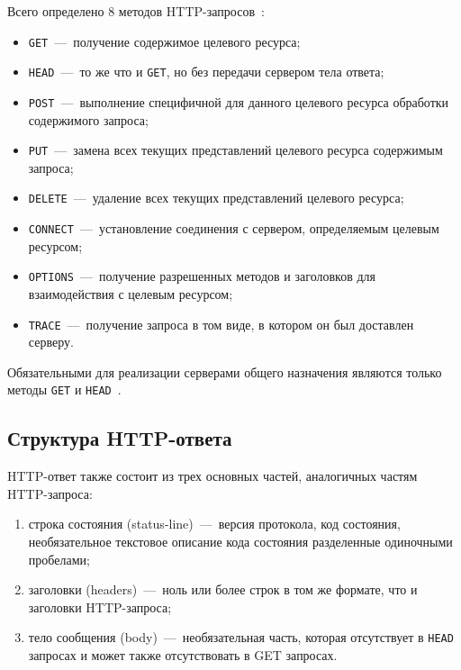 Всего определено 8 методов HTTP-запросов~\cite{rfc9110}:
\begin{itemize}
	\item \texttt{GET}~---~получение содержимое целевого ресурса;
	\item \texttt{HEAD}~---~то же что и \texttt{GET}, но без передачи сервером тела ответа;
	\item \texttt{POST}~---~выполнение специфичной для данного целевого ресурса обработки содержимого запроса;
	\item \texttt{PUT}~---~замена всех текущих представлений целевого ресурса содержимым запроса;
	\item \texttt{DELETE}~---~удаление всех текущих представлений целевого ресурса;
	\item \texttt{CONNECT}~---~установление соединения с сервером, определяемым целевым ресурсом;
	\item \texttt{OPTIONS}~---~получение разрешенных методов и заголовков для взаимодействия с целевым ресурсом;
	\item \texttt{TRACE}~---~получение запроса в том виде, в котором он был доставлен серверу.
\end{itemize}

Обязательными для реализации серверами общего назначения являются только методы \texttt{GET} и \texttt{HEAD}~\cite{rfc9110}.

\subsection{Структура HTTP-ответа}
HTTP-ответ также состоит из трех основных частей, аналогичных частям HTTP-запроса:
\begin{enumerate}
	\item строка состояния (status-line)~---~версия протокола, код состояния, необязательное текстовое описание кода состояния разделенные одиночными пробелами;
	\item заголовки (headers)~---~ноль или более строк в том же формате, что и заголовки HTTP-запроса;
	\item тело сообщения (body)~---~необязательная часть, которая отсутствует в \texttt{HEAD} запросах и может также отсутствовать в {GET} запросах.
\end{enumerate}

